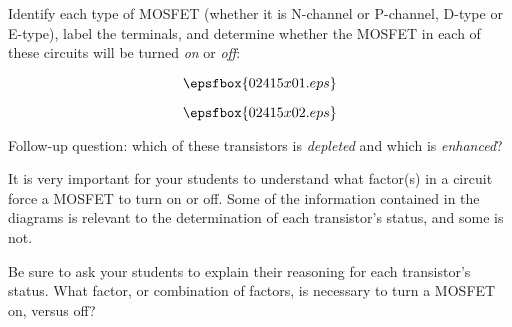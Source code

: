 

Identify each type of MOSFET (whether it is N-channel or P-channel, D-type or E-type), label the terminals, and determine whether the MOSFET in each of these circuits will be turned {\it on} or {\it off}:

$$\epsfbox{02415x01.eps}$$







$$\epsfbox{02415x02.eps}$$

\vskip 10pt

Follow-up question: which of these transistors is {\it depleted} and which is {\it enhanced}?







It is very important for your students to understand what factor(s) in a circuit force a MOSFET to turn on or off.  Some of the information contained in the diagrams is relevant to the determination of each transistor's status, and some is not.

Be sure to ask your students to explain their reasoning for each transistor's status.  What factor, or combination of factors, is necessary to turn a MOSFET on, versus off?





